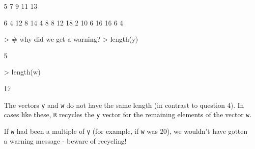 \documentclass[answers]{exam}
\begin{document}
\begin{solution}
\begin{Schunk}
\end{Schunk}
\begin{Schunk}
\end{Schunk}
\begin{Schunk}
\end{Schunk}
\begin{Schunk}
\begin{Soutput}
[1]  5  7  9 11 13
\end{Soutput}
\end{Schunk}
\begin{Schunk}
\begin{Soutput}
 [1]  6  4 12  8 14  4  8  8 12 18  2 10  6 16 16  6  4
\end{Soutput}
\begin{Sinput}
> # why did we get a warning?
> length(y)
\end{Sinput}
\begin{Soutput}
[1] 5
\end{Soutput}
\begin{Sinput}
> length(w)
\end{Sinput}
\begin{Soutput}
[1] 17
\end{Soutput}
\end{Schunk}


\noindent The vectors \texttt{y} and \texttt{w} do not have the same length (in contrast to question 4). In cases like these, \texttt{R} recycles the \texttt{y} vector for the remaining elements of the vector \texttt{w}. 

\noindent If \texttt{w} had been a multiple of \texttt{y} (for example, if \texttt{w} was 20), we wouldn't have gotten a warning message - beware of recycling!

\begin{Schunk}
\end{Schunk}

\end{solution}
\end{document}
